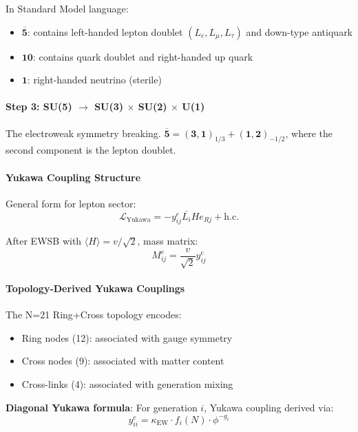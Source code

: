 \documentclass[12pt,a4paper]{article}
\begin{document}
In Standard Model language:
\begin{itemize}
\item $\mathbf{\overline{5}}$: contains left-handed lepton doublet $(L_e, L_\mu, L_\tau)$ and down-type antiquark
\item $\mathbf{10}$: contains quark doublet and right-handed up quark
\item $\mathbf{1}$: right-handed neutrino (sterile)
\end{itemize}

\paragraph{Step 3: SU(5) $\to$ SU(3) $\times$ SU(2) $\times$ U(1)}

The electroweak symmetry breaking. $\mathbf{\overline{5}} = (\mathbf{3}, \mathbf{1})_{1/3} + (\mathbf{1}, \mathbf{2})_{-1/2}$, where the second component is the lepton doublet.

\paragraph{Yukawa Coupling Structure}

General form for lepton sector:
\begin{equation}
\mathcal{L}_{\mathrm{Yukawa}} = -y_{ij}^e \overline{L_i} H e_{Rj} + \mathrm{h.c.}
\end{equation}

After EWSB with $\langle H \rangle = v/\sqrt{2}$, mass matrix:
\begin{equation}
M_{ij}^e = \frac{v}{\sqrt{2}} y_{ij}^e
\end{equation}

\paragraph{Topology-Derived Yukawa Couplings}

The N=21 Ring+Cross topology encodes:
\begin{itemize}
\item Ring nodes (12): associated with gauge symmetry
\item Cross nodes (9): associated with matter content
\item Cross-links (4): associated with generation mixing
\end{itemize}

\textbf{Diagonal Yukawa formula}: For generation $i$, Yukawa coupling derived via:
\begin{equation}
y_{ii}^e = \kappa_{\mathrm{EW}} \cdot f_i(N) \cdot \phi^{-g_i}
\end{equation}
\end{document}
